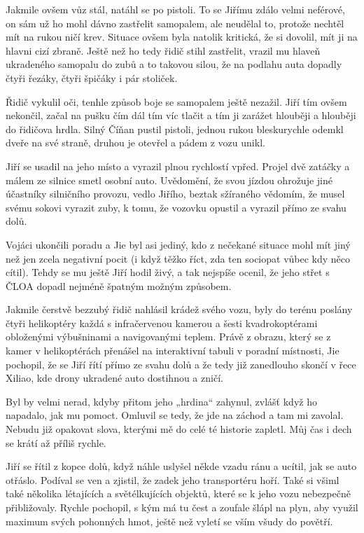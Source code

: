 Jakmile ovšem vůz stál, natáhl se po pistoli. To se Jiřímu zdálo velmi neférové, on sám už ho mohl dávno zastřelit samopalem, ale neudělal to, protože nechtěl mít na rukou ničí krev. Situace ovšem byla natolik kritická, že si dovolil, mít ji na hlavni cizí zbraně. Ještě než ho tedy řidič stihl zastřelit, vrazil mu hlaveň ukradeného samopalu do zubů a to takovou silou, že na podlahu auta dopadly čtyři řezáky, čtyři špičáky i pár stoliček.

Řidič vykulil oči, tenhle způsob boje se samopalem ještě nezažil. Jiří tím ovšem nekončil, začal na pušku čím dál tím víc tlačit a tím ji zarážet hlouběji a hlouběji do řidičova hrdla. Silný Číňan pustil pistoli, jednou rukou bleskurychle odemkl dveře na své straně, druhou je otevřel a pádem z vozu unikl.

Jiří se usadil na jeho místo a vyrazil plnou rychlostí vpřed. Projel dvě zatáčky a málem ze silnice smetl osobní auto. Uvědomění, že svou jízdou ohrožuje jiné účastníky silničního provozu, vedlo Jiřího, beztak sžíraného vědomím, že musel svému sokovi vyrazit zuby, k tomu, že vozovku opustil a vyrazil přímo ze svahu dolů.
\vspace{0.75cm}

Vojáci ukončili poradu a Jie byl asi jediný, kdo z nečekané situace mohl mít jiný než jen zcela negativní pocit (i když těžko říct, zda ten sociopat vůbec kdy něco cítil). Tehdy se mu ještě Jiří hodil živý, a tak nejspíše ocenil, že jeho střet s ČLOA dopadl nejméně špatným možným způsobem.

Jakmile čerstvě bezzubý řidič nahlásil krádež svého vozu, byly do terénu poslány čtyři helikoptéry každá s infračervenou kamerou a šesti kvadrokoptérami obloženými výbušninami a navigovanými teplem. Právě z obrazu, který se z kamer v helikoptérách přenášel na interaktivní tabuli v poradní místnosti, Jie pochopil, že se Jiří řítí přímo ze svahu dolů a že tedy již zanedlouho skončí v řece Xiliao, kde drony ukradené auto dostihnou a zničí.

Byl by velmi nerad, kdyby přitom jeho „hrdina“ zahynul, zvlášť když ho napadalo, jak mu pomoct. Omluvil se tedy, že jde na záchod a tam mi zavolal. Nebudu již opakovat slova, kterými mě do celé té historie zapletl. Můj čas i dech se krátí až příliš rychle.
\vspace{0.75cm}

Jiří se řítil z kopce dolů, když náhle uslyšel někde vzadu ránu a ucítil, jak se auto otřáslo. Podíval se ven a zjistil, že zadek jeho transportéru hoří. Také si všiml také několika létajících a světélkujících objektů, které se k jeho vozu nebezpečně přibližovaly. Rychle pochopil, s kým má tu čest a zoufale šlápl na plyn, aby využil maximum svých pohonných hmot, ještě než vyletí se vším všudy do povětří.

